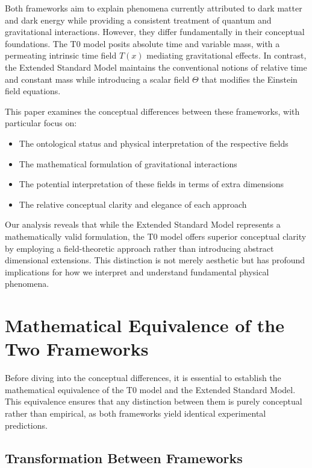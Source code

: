 \documentclass[12pt,a4paper]{article}
\newcommand{\Tfield}{T(x)}
\begin{document}
	Both frameworks aim to explain phenomena currently attributed to dark matter and dark energy while providing a consistent treatment of quantum and gravitational interactions. However, they differ fundamentally in their conceptual foundations. The T0 model posits absolute time and variable mass, with a permeating intrinsic time field \(\Tfield\) mediating gravitational effects. In contrast, the Extended Standard Model maintains the conventional notions of relative time and constant mass while introducing a scalar field \(\Theta\) that modifies the Einstein field equations.
	
	This paper examines the conceptual differences between these frameworks, with particular focus on:
	
	\begin{itemize}
		\item The ontological status and physical interpretation of the respective fields
		\item The mathematical formulation of gravitational interactions
		\item The potential interpretation of these fields in terms of extra dimensions
		\item The relative conceptual clarity and elegance of each approach
	\end{itemize}
	
	Our analysis reveals that while the Extended Standard Model represents a mathematically valid formulation, the T0 model offers superior conceptual clarity by employing a field-theoretic approach rather than introducing abstract dimensional extensions. This distinction is not merely aesthetic but has profound implications for how we interpret and understand fundamental physical phenomena.
	
	\section{Mathematical Equivalence of the Two Frameworks}
	\label{sec:mathematical_equivalence}
	
	Before diving into the conceptual differences, it is essential to establish the mathematical equivalence of the T0 model and the Extended Standard Model. This equivalence ensures that any distinction between them is purely conceptual rather than empirical, as both frameworks yield identical experimental predictions.
	
	\subsection{Transformation Between Frameworks}
	\label{subsec:transformation}
	
\end{document}
